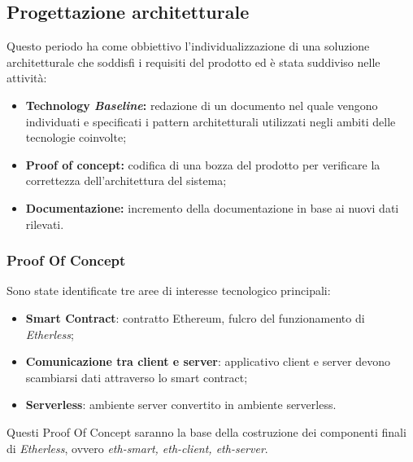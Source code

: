 \subsection{Progettazione architetturale}
Questo periodo ha come obbiettivo l'individualizzazione di una soluzione architetturale che soddisfi i requisiti del prodotto ed è stata suddiviso nelle attività:
\begin{itemize}
	\item \textbf{Technology \textit{Baseline\glos}:} redazione di un documento nel quale vengono individuati e specificati i pattern architetturali utilizzati negli ambiti delle tecnologie coinvolte;
	\item  \textbf{Proof of concept:} codifica di una bozza del prodotto per verificare la correttezza dell'architettura del sistema;
	\item \textbf{Documentazione:} incremento della documentazione in base ai nuovi dati rilevati.
\end{itemize}
\subsubsection{Proof Of Concept}
Sono state identificate tre aree di interesse tecnologico principali:
\begin{itemize}
	\item \textbf{Smart Contract}: contratto Ethereum\glo, fulcro del funzionamento di \textit{Etherless};
	\item \textbf{Comunicazione tra client e server}: applicativo client e server devono scambiarsi dati attraverso lo smart contract;
	\item \textbf{Serverless\glo}: ambiente server convertito in ambiente serverless\glos.
\end{itemize}
Questi Proof Of Concept saranno la base della costruzione dei componenti finali di \textit{Etherless}, ovvero \textit{eth-smart, eth-client, eth-server}.
